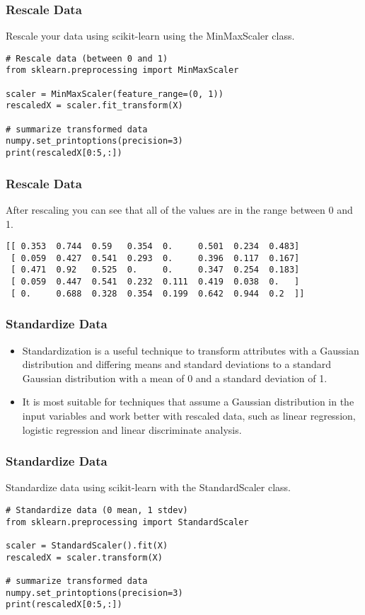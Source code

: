 \begin{frame}[fragile]\frametitle{Rescale Data}
Rescale your data using scikit-learn using the MinMaxScaler class.
\begin{lstlisting}
# Rescale data (between 0 and 1)
from sklearn.preprocessing import MinMaxScaler

scaler = MinMaxScaler(feature_range=(0, 1))
rescaledX = scaler.fit_transform(X)

# summarize transformed data
numpy.set_printoptions(precision=3)
print(rescaledX[0:5,:])
\end{lstlisting}
\end{frame}

\begin{frame}[fragile]\frametitle{Rescale Data}
After rescaling you can see that all of the values are in the range between 0 and 1.
\begin{lstlisting}
[[ 0.353  0.744  0.59   0.354  0.     0.501  0.234  0.483]
 [ 0.059  0.427  0.541  0.293  0.     0.396  0.117  0.167]
 [ 0.471  0.92   0.525  0.     0.     0.347  0.254  0.183]
 [ 0.059  0.447  0.541  0.232  0.111  0.419  0.038  0.   ]
 [ 0.     0.688  0.328  0.354  0.199  0.642  0.944  0.2  ]]
\end{lstlisting}
\end{frame}


\begin{frame}[fragile]\frametitle{Standardize Data}

	\begin{itemize}
	\item Standardization is a useful technique to transform attributes with a Gaussian distribution and differing means and standard deviations to a standard Gaussian distribution with a mean of 0 and a standard deviation of 1.
	\item It is most suitable for techniques that assume a Gaussian distribution in the input variables and work better with rescaled data, such as linear regression, logistic regression and linear discriminate analysis.
	\end{itemize}
	
\end{frame}

\begin{frame}[fragile]\frametitle{Standardize Data}
Standardize data using scikit-learn with the StandardScaler class.
\begin{lstlisting}
# Standardize data (0 mean, 1 stdev)
from sklearn.preprocessing import StandardScaler

scaler = StandardScaler().fit(X)
rescaledX = scaler.transform(X)

# summarize transformed data
numpy.set_printoptions(precision=3)
print(rescaledX[0:5,:])
\end{lstlisting}
\end{frame}

